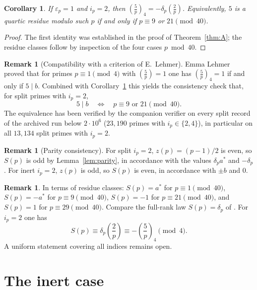\documentclass[11pt]{amsart}
\theoremstyle{plain}
\newtheorem{corollary}[theorem]{Corollary}
\theoremstyle{definition}
\newtheorem{remark}[theorem]{Remark}
\newcommand{\leg}[2]{\left(\frac{#1}{#2}\right)}
\newcommand{\qleg}[2]{\left(\frac{#1}{#2}\right)_{\!4}}
\begin{document}
\begin{corollary}\label{cor:quartic-five}
If $\varepsilon_p=1$ and $i_p=2$, then $\qleg5p=-\delta_p\leg2p$.
Equivalently, $5$ is a quartic residue modulo such $p$ if and only if
$p\equiv9$ or $21\pmod{40}$.
\end{corollary}
\begin{proof}
The first identity was established in the proof of Theorem~\ref{thm:A}; the
residue classes follow by inspection of the four cases $p\bmod40$.
\end{proof}

\begin{remark}[Compatibility with a criterion of E.~Lehmer]
Emma Lehmer~\cite{ELehmer1958} proved that for primes $p\equiv1\pmod4$ with
$\leg5p=1$ one has $\qleg5p=1$ if and only if $5\mid b$. Combined with
Corollary~\ref{cor:quartic-five} this yields the consistency check that, for
split primes with $i_p=2$,
\[
  5\mid b\quad\Longleftrightarrow\quad p\equiv9\text{ or }21\pmod{40}.
\]
The equivalence has been verified by the companion verifier on every split
record of the archived run below $2\cdot10^{6}$ ($23{,}190$ primes with
$i_p\in\{2,4\}$), in particular on all $13{,}134$ split primes with $i_p=2$.
\end{remark}

\begin{remark}[Parity consistency]
For split $i_p=2$, $z(p)=(p-1)/2$ is even, so $S(p)$ is odd by
Lemma~\ref{lem:parity}, in accordance with the values $\delta_p a^{*}$ and $-\delta_p$.
For inert $i_p=2$, $z(p)$ is odd, so $S(p)$ is even, in accordance with
$\pm b$ and $0$.
\end{remark}

\begin{remark}
In terms of residue classes: $S(p)=a^{*}$ for $p\equiv1\pmod{40}$,
$S(p)=-a^{*}$ for $p\equiv9\pmod{40}$, $S(p)=-1$ for $p\equiv21\pmod{40}$, and
$S(p)=1$ for $p\equiv29\pmod{40}$. Compare the full-rank law $S(p)=\delta_p$ of
\cite{Ghandali2026Preprint}. For $i_p=2$ one has
\[
  S(p)\equiv \delta_p\leg2p \equiv -\qleg5p \pmod4.
\]
A uniform statement covering all indices remains open.
\end{remark}

\section{The inert case}\label{sec:inert}
\end{document}
